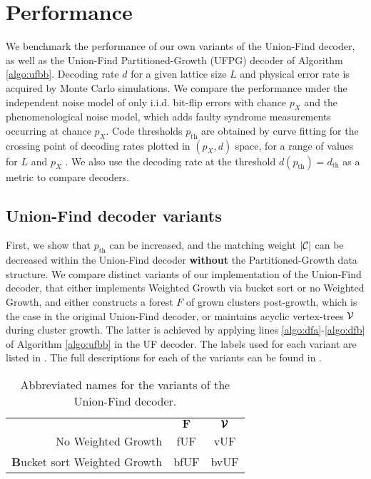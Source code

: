 \section{Performance}\label{sec:performance}

We benchmark the performance of our own variants of the Union-Find decoder, as well as the Union-Find Partitioned-Growth (UFPG) decoder of Algorithm \ref{algo:ufbb}. Decoding rate $d$ for a given lattice size $L$ and physical error rate is acquired by Monte Carlo simulations. We compare the performance under the independent noise model of only i.i.d. bit-flip errors with chance $p_X$ and the phenomenological noise model, which adds faulty syndrome measurements occurring at chance $p_X$. Code thresholds $p_{\text{th}}$ are obtained by curve fitting for the crossing point of decoding rates plotted in $(p_X, d)$ space, for a range of values for $L$ and $p_X$ \cite{wang2003confinement}. We also use the decoding rate at the threshold $d(p_{\text{th}})= d_{\text{th}}$ as a metric to compare decoders. 

\subsection{Union-Find decoder variants}

First, we show that $p_{\text{th}}$ can be increased, and the matching weight $\lvert\mathcal{C}\rvert$ can be decreased within the Union-Find decoder \textbf{without} the Partitioned-Growth data structure. We compare distinct variants of our implementation of the Union-Find decoder, that either implements Weighted Growth via bucket sort or no Weighted Growth, and either constructs a forest $F$ of grown clusters post-growth, which is the case in the original Union-Find decoder, or maintains acyclic vertex-trees $\mathcal{V}$ during cluster growth. The latter is achieved by applying lines \ref{algo:dfa}-\ref{algo:dfb} of Algorithm \ref{algo:ufbb} in the UF decoder. The labels used for each variant are listed in . The full descriptions for each of the variants can be found in \cite{markthesis}.

\begin{table}[htbp]
  \centering
  \begin{tabularx}{\linewidth} { | R{2} || C{.5} | C{.5} | }
    \hline
    & $\mathbf{F}$ &  $\pmb{\mathcal{V}}$\\
    \hhline{|=::=:=|}
    No Weighted Growth & fUF  & vUF \\
    \hline
    \textbf{B}ucket sort Weighted Growth & bfUF & bvUF \\
    \hline
  \end{tabularx}
  \caption{Abbreviated names for the variants of the Union-Find decoder.}\label{tab:uftable}
\end{table}

